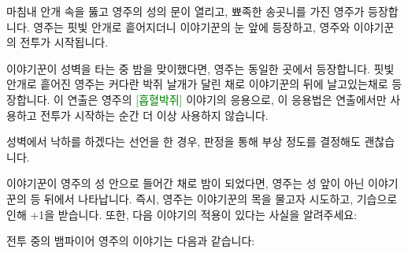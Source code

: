 \documentclass{report}
\begin{document}
	
	마침내 안개 속을 뚫고 영주의 성의 문이 열리고, 뾰족한 송곳니를 가진 영주가 등장합니다. 영주는 핏빛 안개로 흩어지더니 이야기꾼의 눈 앞에 등장하고, 영주와 이야기꾼의 전투가 시작됩니다.
	
	\medskip
	
	이야기꾼이 성벽을 타는 중 밤을 맞이했다면, 영주는 동일한 곳에서 등장합니다. 핏빛 안개로 흩어진 영주는 커다란 박쥐 날개가 달린 채로 이야기꾼의 뒤에 날고있는채로 등장합니다. 이 연출은 영주의 \textcolor{Green}{[흡혈박쥐]} 이야기의 응용으로, 이 응용법은 연출에서만 사용하고 전투가 시작하는 순간 더 이상 사용하지 않습니다.
	
	성벽에서 낙하를 하겠다는 선언을 한 경우, 판정을 통해 부상 정도를 결정해도 괜찮습니다.
	
	\medskip
	
	이야기꾼이 영주의 성 안으로 들어간 채로 밤이 되었다면, 영주는 성 앞이 아닌 이야기꾼의 등 뒤에서 나타납니다. 즉시, 영주는 이야기꾼의 목을 물고자 시도하고, 기습으로 인해 +1을 받습니다. 또한, 다음 이야기의 적용이 있다는 사실을 알려주세요:
	
	
	전투 중의 뱀파이어 영주의 이야기는 다음과 같습니다:
	
\end{document}
